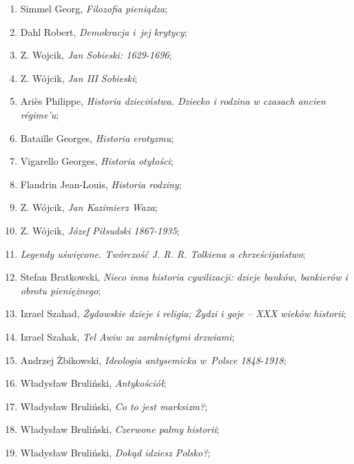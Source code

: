 \documentclass[a4paper,11pt]{article}
\begin{document}
\begin{enumerate}
\item Simmel Georg, \emph{Filozofia pieniądza};

\item Dahl Robert, \emph{Demokracja i~jej krytycy};

\item Z. Wojcik, \emph{Jan Sobieski: 1629-1696};

\item Z. Wójcik, \emph{Jan III Sobieski};

\item Ariès Philippe, \emph{Historia dzieciństwa. Dziecko i rodzina w
    czasach ancien régime’u};

\item Bataille Georges, \emph{Historia erotyzmu};

\item Vigarello Georges, \emph{Historia otyłości};

\item Flandrin Jean-Louis, \emph{Historia rodziny};

\item Z. Wójcik, \emph{Jan Kazimierz Waza};

\item Z. Wójcik, \emph{Józef Piłsudski 1867-1935};

\item \emph{Legendy uświęcone. Twórczość J. R. R. Tolkiena a
    chrześcijaństwo};

\item Stefan Bratkowski, \emph{Nieco inna historia cywilizacji: dzieje
    banków, bankierów i obrotu pieniężnego};

\item Izrael Szahad, \emph{Żydowskie dzieje i religia; Żydzi i goje –
    XXX wieków historii};

\item Izrael Szahak, \emph{Tel Awiw za zamkniętymi drzwiami};

\item Andrzej Żbikowski, \emph{Ideologia antysemicka w~Polsce
    1848-1918};

\item Władysław Bruliński, \emph{Antykościół};

\item Władysław Bruliński, \emph{Co to jest marksizm?};

\item Władysław Bruliński, \emph{Czerwone palmy historii};

\item Władysław Bruliński, \emph{Dokąd idziesz Polsko?};


\end{enumerate}
\end{document}
